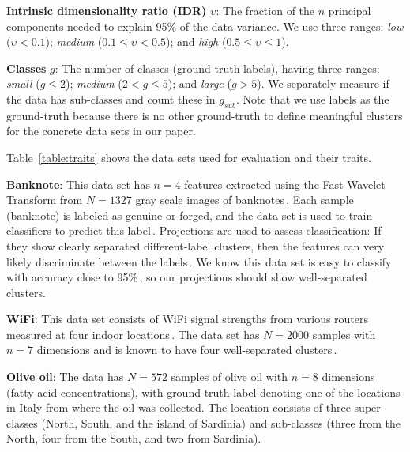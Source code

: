 \documentclass[sagev,Afour,times]{sagej}
\begin{document}
\noindent\textbf{Intrinsic dimensionality ratio (IDR)} $\upsilon$: The fraction of the $n$ principal components needed to explain 95\% of the data variance. We use three ranges: \emph{low} ($\upsilon < 0.1$); \emph{medium} ($0.1 \leq \upsilon < 0.5$); and \emph{high} ($0.5 \leq \upsilon \leq 1$).

\noindent\textbf{Classes} $g$: The number of classes (ground-truth labels), having three ranges: \emph{small} ($g \leq 2$); \emph{medium} ($2 < g \leq 5$); and \emph{large} ($g > 5$). We separately measure if the data has sub-classes and count these in $g_{sub}$. Note that we use labels as the ground-truth because there is no other ground-truth to define meaningful clusters for the concrete data sets in our paper.


Table~\ref{table:traits} shows the data sets used for evaluation and their traits.

\noindent\textbf{Banknote}: This data set has $n=4$ features extracted using the Fast Wavelet Transform from $N=1327$ gray scale images of banknotes\,\cite{realworld:uciML}. Each sample (banknote) is labeled as genuine or forged, and the data set is used to train classifiers to predict this label\,\cite{bank_classif}. Projections are used to assess classification: If they show clearly separated different-label clusters, then the features can very likely discriminate between the labels\,\cite{rauber}. We know this data set is easy to classify with accuracy close to 95\%\,\cite{rak,bank_classif}, so our projections should show well-separated clusters.

\noindent\textbf{WiFi}: This data set consists of WiFi signal strengths from various routers measured at four indoor locations\,\cite{realworld:uciML,realworld:wifi,realworld:wifi2}. The data set has $N=2000$ samples with $n=7$ dimensions and is known to have four well-separated clusters\,\cite{realworld:wifi_clustering}. 

\noindent\textbf{Olive oil}: The data has $N=572$ samples of olive oil with $n=8$ dimensions (fatty acid concentrations), with ground-truth label denoting one of the locations in Italy from where the oil was collected. The location consists of three super-classes (North, South, and the island of Sardinia) and sub-classes (three from the North, four from the South, and two from Sardinia).
\end{document}
